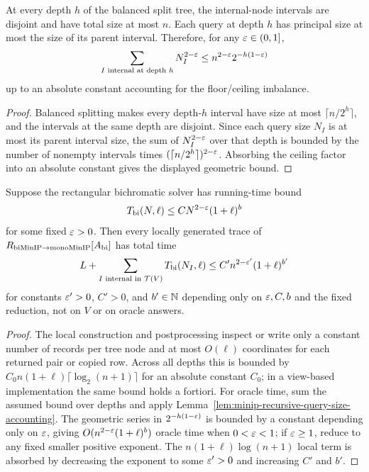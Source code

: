 \begin{lemma}
  \label{lem:minip-recursive-query-size-accounting}
  At every depth $h$ of the balanced split tree, the internal-node intervals
  are disjoint and have total size at most $n$.  Each query at depth $h$ has
  principal size at most the size of its parent interval.  Therefore, for any
  $\varepsilon\in(0,1]$,
  \[
    \sum_{I\text{ internal at depth }h} N_I^{2-\varepsilon}
    \leq
    n^{2-\varepsilon}2^{-h(1-\varepsilon)}
  \]
  up to an absolute constant accounting for the floor/ceiling imbalance.
\end{lemma}
\begin{proof}
  Balanced splitting makes every depth-$h$ interval have size at most
  $\lceil n/2^h\rceil$, and the intervals at the same depth are disjoint.
  Since each query size $N_I$ is at most its parent interval size, the sum of
  $N_I^{2-\varepsilon}$ over that depth is bounded by the number of nonempty intervals
  times $(\lceil n/2^h\rceil)^{2-\varepsilon}$.  Absorbing the ceiling factor into an
  absolute constant gives the displayed geometric bound.
\end{proof}

\begin{lemma}
  \label{lem:minip-recursive-cost-transfer}
  Suppose the rectangular bichromatic solver has running-time bound
  \[
    T_{\rm bi}(N,\ell)\leq C N^{2-\varepsilon}(1+\ell)^b
  \]
  for some fixed $\varepsilon>0$.  Then every locally generated trace of
  $R_{\rm biMinIP\to monoMinIP}[A_{\rm bi}]$ has total time
  \[
    L+\sum_{I\text{ internal in }\mathcal T(V)}T_{\rm bi}(N_I,\ell)
    \leq C'n^{2-\varepsilon'}(1+\ell)^{b'}
  \]
  for constants $\varepsilon'>0$, $C'>0$, and $b'\in\mathbb{N}$ depending only on
  $\varepsilon,C,b$ and the fixed reduction, not on $V$ or on oracle answers.
\end{lemma}
\begin{proof}
  The local construction and postprocessing inspect or write only a constant
  number of records per tree node and at most $O(\ell)$ coordinates for each
  returned pair or copied row.  Across all depths this is bounded by
  $C_0n(1+\ell)\lceil\log_2(n+1)\rceil$ for an absolute constant $C_0$; in a
  view-based implementation the same bound holds a fortiori.  For oracle time,
  sum the assumed bound over depths and apply
  Lemma~\ref{lem:minip-recursive-query-size-accounting}.  The geometric series
  in $2^{-h(1-\varepsilon)}$ is bounded by a constant depending only on $\varepsilon$, giving
  $O(n^{2-\varepsilon}(1+\ell)^b)$ oracle time when $0<\varepsilon<1$; if $\varepsilon\geq1$, reduce
  to any fixed smaller positive exponent.  The
  $n(1+\ell)\log(n+1)$ local term is absorbed by decreasing the exponent to
  some $\varepsilon'>0$ and increasing $C'$ and $b'$.
\end{proof}

